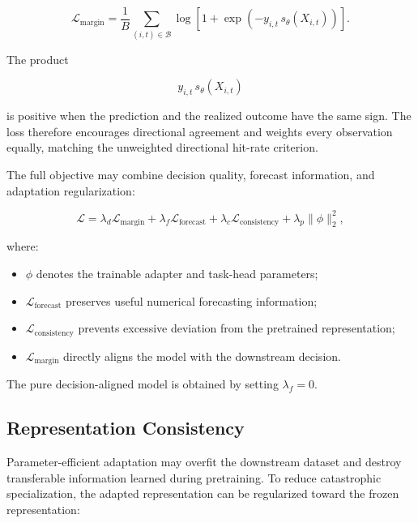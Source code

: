 \documentclass[11pt]{article}
\begin{document}
\begin{equation}
\mathcal{L}_{\mathrm{margin}}
=
\frac{1}{B}
\sum_{(i,t)\in\mathcal B}
\log
\left[
1+
\exp
\left(
-y_{i,t}\,s_\theta(X_{i,t})
\right)
\right].
\end{equation}

The product

\begin{equation}
y_{i,t}\,s_\theta(X_{i,t})
\end{equation}

is positive when the prediction and the realized outcome have the same sign.
The loss therefore encourages directional agreement and weights every
observation equally, matching the unweighted directional hit-rate criterion.

The full objective may combine decision quality, forecast information, and
adaptation regularization:

\begin{equation}
\mathcal{L}
=
\lambda_d
\mathcal{L}_{\mathrm{margin}}
+
\lambda_f
\mathcal{L}_{\mathrm{forecast}}
+
\lambda_c
\mathcal{L}_{\mathrm{consistency}}
+
\lambda_p
\|\phi\|_2^2,
\end{equation}

where:

\begin{itemize}
    \item $\phi$ denotes the trainable adapter and task-head parameters;
    \item $\mathcal{L}_{\mathrm{forecast}}$ preserves useful numerical
    forecasting information;
    \item $\mathcal{L}_{\mathrm{consistency}}$ prevents excessive deviation
    from the pretrained representation;
    \item $\mathcal{L}_{\mathrm{margin}}$ directly aligns the model with the
    downstream decision.
\end{itemize}

The pure decision-aligned model is obtained by setting $\lambda_f=0$.

\subsection{Representation Consistency}

Parameter-efficient adaptation may overfit the downstream dataset and destroy
transferable information learned during pretraining. To reduce catastrophic
specialization, the adapted representation can be regularized toward the
frozen representation:
\end{document}
